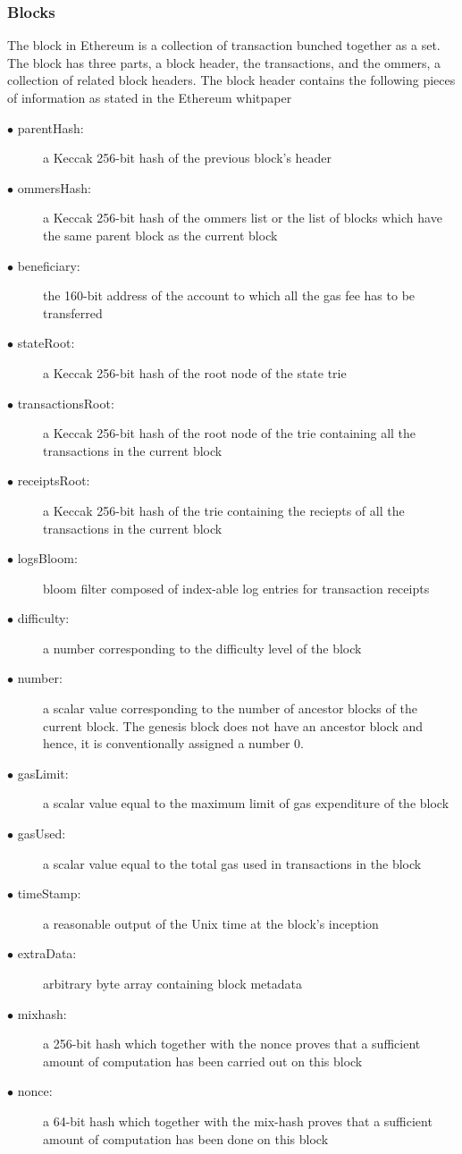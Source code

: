 \documentclass[a4paper,twoside,phd]{BYUPhys}
\begin{document}
\subsubsection{Blocks}
The block in Ethereum is a collection of transaction bunched together as a set. The block has three parts, a block header, the transactions, and the ommers, a collection of related block headers\cite{}. The block header contains the following pieces of information as stated in the Ethereum whitpaper\cite{}
\begin{description}
\item[$\bullet$ parentHash:] a Keccak 256-bit hash of the previous block's header
\item[$\bullet$ ommersHash:] a Keccak 256-bit hash of the ommers list or the list of blocks which have the same parent block as the current block
\item[$\bullet$ beneficiary:] the 160-bit address of the account to which all the gas fee has to be transferred
\item[$\bullet$ stateRoot:] a Keccak 256-bit hash of the root node of the state trie
\item[$\bullet$ transactionsRoot:] a Keccak 256-bit hash of the root node of the trie containing all the transactions in the current block
\item[$\bullet$ receiptsRoot:] a Keccak 256-bit hash of the trie containing the reciepts of all the transactions in the current block
\item[$\bullet$ logsBloom:] bloom filter composed of index-able log entries for transaction receipts
\item[$\bullet$ difficulty:] a number corresponding to the difficulty level of the block
\item[$\bullet$ number:] a scalar value corresponding to the number of ancestor blocks of the current block. The genesis block does not have an ancestor block and hence, it is conventionally assigned a number 0.
\item[$\bullet$ gasLimit:] a scalar value equal to the maximum limit of gas expenditure of the block
\item[$\bullet$ gasUsed:] a scalar value equal to the total gas used in transactions in the block
\item[$\bullet$ timeStamp:] a reasonable output of the Unix time at the block's inception
\item[$\bullet$ extraData:] arbitrary byte array containing block metadata
\item[$\bullet$ mixhash:] a 256-bit hash which together with the nonce proves that a sufficient amount of computation has been carried out on this block
\item[$\bullet$ nonce:] a 64-bit hash which together with the mix-hash proves that a sufficient amount of computation has been done on this block
\end{description}
\end{document}
